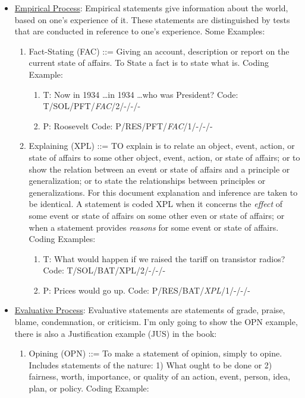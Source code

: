 \documentclass[10pt, letterpaper]{article}
\begin{document}
\begin{itemize}
\begin{itemize}
\item \uline{Empirical Process}: Empirical statements give information about the world, based on one's experience of it. These statements are distinguished by tests that are conducted in reference to one's experience. Some Examples:
\begin{enumerate}
\item Fact-Stating (FAC) ::= Giving an account, description or report on the current state of affairs. To State a fact is to state what is. Coding Example:
\begin{enumerate}
\item T: Now in 1934 \ldots in 1934 \ldots who was President? Code: T/SOL/PFT/\textit{FAC}/2/-/-/-
\item P: Roosevelt Code: P/RES/PFT/\textit{FAC}/1/-/-/-
\end{enumerate}
\item Explaining (XPL) ::= TO explain is to relate an object, event, action, or state of affairs to some other object, event, action, or state of affairs; or to show the relation between an event or state of affairs and a principle or generalization; or to state the relationships between principles or generalizations. For this document explanation and inference are taken to be identical. A statement is coded XPL when it concerns the \emph{effect} of some event or state of affairs on some other even or state of affairs; or when a statement provides \emph{reasons} for some event or state of affairs. Coding Examples:
\begin{enumerate}
\item T: What would happen if we raised the tariff on transistor radios? Code: T/SOL/BAT/XPL/2/-/-/-
\item P: Prices would go up. Code: P/RES/BAT/\textit{XPL}/1/-/-/-
\end{enumerate}
\end{enumerate}
\item \uline{Evaluative Process}: Evaluative statements are statements of grade, praise, blame, condemnation, or criticism. I'm only going to show the OPN example, there is also a Justification example (JUS) in the book:
\begin{enumerate}
\item Opining (OPN) ::= To make a statement of opinion, simply to opine. Includes statements of the nature: 1) What ought to be done or 2) fairness, worth, importance, or quality of an action, event, person, idea, plan, or policy. Coding Example:
\begin{enumerate}

\end{enumerate}
\end{enumerate}
\end{itemize}
\end{itemize}
\end{document}
